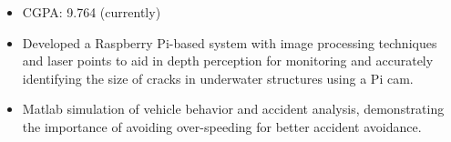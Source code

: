 \documentclass[10pt,a4paper,ragged2e,withhyper]{altacv}
\begin{document}
\begin{paracol}{2}
\begin{itemize}
            \end{itemize}
        
            \begin{itemize}
                \item CGPA: 9.764 (currently)
            \end{itemize}


            \begin{itemize}
                \item Developed a Raspberry Pi-based system with image processing techniques and laser points to aid in depth perception for monitoring and accurately identifying the size of cracks in underwater structures using a Pi cam.
            \end{itemize}
            \divider
            
            \begin{itemize}
                \item Matlab simulation of vehicle behavior and accident analysis, demonstrating the importance of avoiding over-speeding for better accident avoidance.
            \end{itemize}
            \divider
            
            

    \end{paracol}
\end{document}
